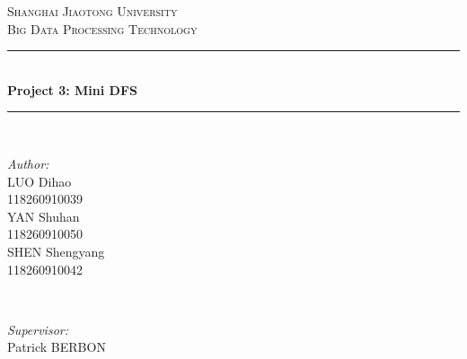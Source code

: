 \documentclass[10pt]{article}
\begin{document}
\begin{titlepage}

\newcommand{\HRule}{\rule{\linewidth}{0.5mm}} %

\center %


\textsc{\LARGE Shanghai Jiaotong University}\\[1.5cm] %
\textsc{\Large Big Data Processing Technology}\\[0.5cm] %


\HRule \\[0.4cm]
{ \huge \bfseries Project 3: Mini DFS}\\[0.4cm] %
\HRule \\[1.5cm]


\begin{minipage}{0.4\textwidth}
\begin{flushleft} \large
\emph{Author:}\\
LUO Dihao \\118260910039\\ %
YAN Shuhan \\118260910050\\ %
SHEN Shengyang \\118260910042\\
\end{flushleft}
\end{minipage}
~
\begin{minipage}{0.4\textwidth}
\begin{flushright} \large
\emph{Supervisor:} \\
Patrick  \textsc{BERBON} %
\end{flushright}
\end{minipage}\\[2cm]


\end{titlepage}
\end{document}
